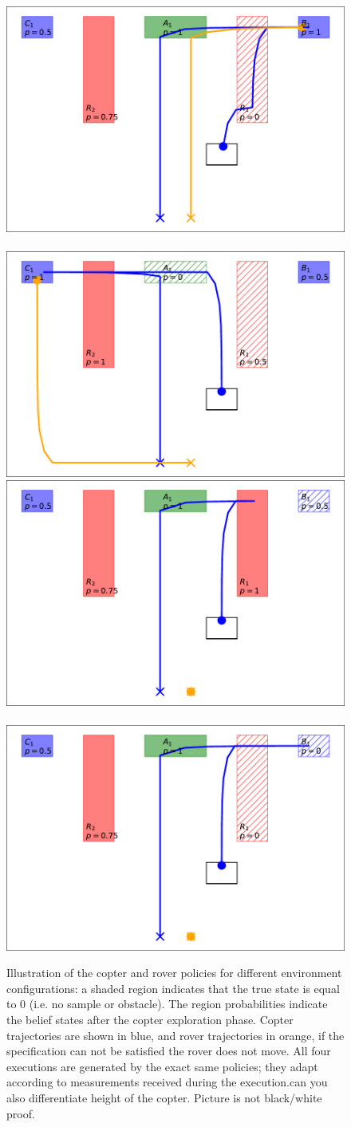 \documentclass[conference]{IEEEtran}
\newcommand{\sofie}[1]{{\color{orange}#1}}
\begin{document}
\begin{figure}
	\begin{center}
	\includegraphics[width=0.4\columnwidth]{2figs/exp0-map.pdf} ~ 
	\includegraphics[width=0.4\columnwidth]{2figs/exp1-map.pdf} \\
	\vspace{1mm} 
	\includegraphics[width=0.4\columnwidth]{2figs/exp2-map.pdf} ~ 
	\includegraphics[width=0.4\columnwidth]{2figs/exp3-map.pdf}
	\end{center}
	\caption{Illustration of the copter and rover policies for different environment configurations: a shaded region indicates that the true state is equal to 0 (i.e. no sample or obstacle). The region probabilities indicate the belief states after the copter exploration phase. Copter trajectories are shown in blue, and rover trajectories in orange, if the specification can not be satisfied the rover does not move. All four executions are generated by the exact same policies; they adapt according to measurements received during the execution.\sofie{can you also differentiate height of the copter. Picture is not black/white proof. } }
	\label{fig:copter_executions}
\end{figure}
\end{document}
